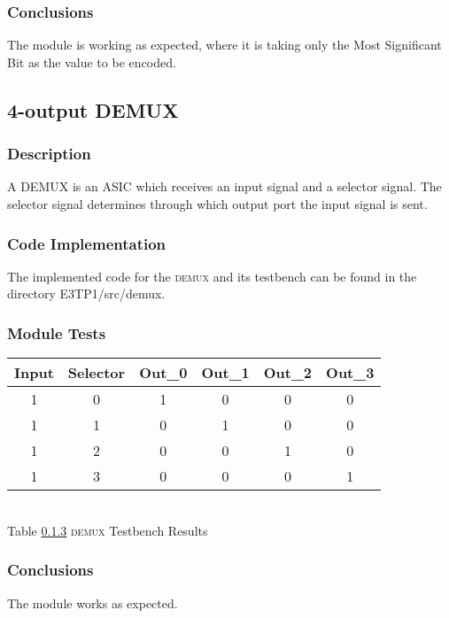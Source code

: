 \subsubsection{\color{orange}Conclusions}
The module is working as expected, where it is taking only the Most Significant Bit as the value to be encoded.

\subsection{\color{purple}4-output DEMUX}

\subsubsection{\color{orange}Description}
A DEMUX is an ASIC which receives an input signal and a selector signal. The selector signal determines through which output port the input signal is sent.

\subsubsection{\color{orange}Code Implementation}
The implemented code for the \textsc{demux} and its testbench can be found in the directory E3TP1/src/demux.

\subsubsection{\color{orange}Module Tests}
\label{subsec2}

\begin{center}
\begin{tabular}{|c|c|c|c|c|c|}
\hline
Input&Selector&Out\_0&Out\_1&Out\_2&Out\_3\\
\hline
1&0&1&0&0&0\\
1&1&0&1&0&0\\
1&2&0&0&1&0\\
1&3&0&0&0&1\\
\hline
\end{tabular}
\\\vspace{12pt}
Table \ref{subsec2} \textsc{demux} Testbench Results
\end{center}

\subsubsection{\color{orange}Conclusions}
The module works as expected.